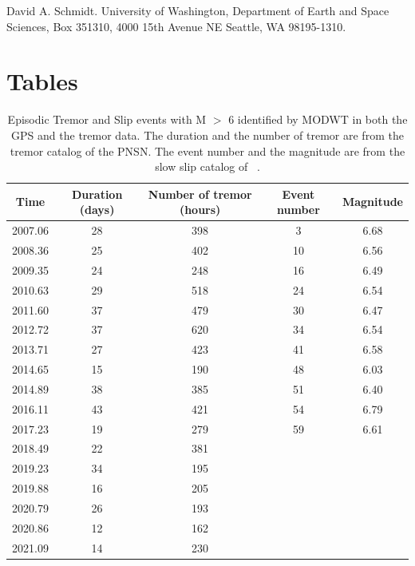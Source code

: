 \documentclass{article}
\begin{document}
David A. Schmidt. University of Washington, Department of Earth and Space Sciences, Box 351310, 4000 15th Avenue NE Seattle, WA 98195-1310.

\newpage

\section*{Tables}

\begin{table}[hbt!]
\caption{Episodic Tremor and Slip events with M $>$ 6 identified by MODWT in both the GPS and the tremor data. The duration and the number of tremor are from the tremor catalog of the PNSN. The event number and the magnitude are from the slow slip catalog of ~\citet{MIC_2019}.}
 \centering
 \begin{tabular}{c c c c c}
 \hline
 Time & Duration (days) & Number of tremor (hours) & Event number & Magnitude \\
 \hline
 2007.06 & 28 & 398 & 3 & 6.68 \\
 2008.36 & 25 & 402 & 10 & 6.56 \\
 2009.35 & 24 & 248 & 16 & 6.49 \\
 2010.63 & 29 & 518 & 24 & 6.54 \\
 2011.60 & 37 & 479 & 30 & 6.47 \\
 2012.72 & 37 & 620 & 34 & 6.54 \\
 2013.71 & 27 & 423 & 41 & 6.58 \\
 2014.65 & 15 & 190 & 48 & 6.03 \\
 2014.89 & 38 & 385 & 51 & 6.40 \\
 2016.11 & 43 & 421 & 54 & 6.79 \\
 2017.23 & 19 & 279 & 59 & 6.61 \\
 2018.49 & 22 & 381 & & \\
 2019.23 & 34 & 195 & & \\
 2019.88 & 16 & 205 & & \\
 2020.79 & 26 & 193 & & \\
 2020.86 & 12 & 162 & & \\
 2021.09 & 14 & 230 & & \\
 \hline
 \end{tabular}
 \end{table}
\end{document}
